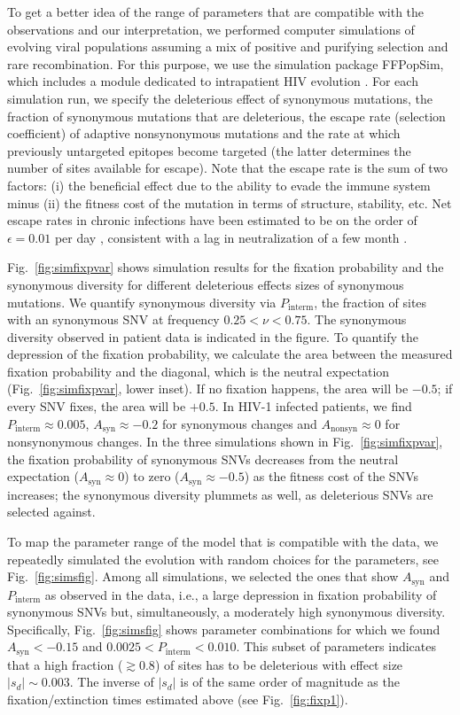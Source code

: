 \documentclass[11pt]{article}
\newcommand{\FIG}[1]{Fig.~\ref{fig:#1}}
\begin{document}
To get a better idea of the range of parameters that are compatible with the
observations and our interpretation, we performed computer simulations of
evolving viral populations assuming a mix of positive and purifying selection
and rare recombination.  For this purpose, we use the simulation package
FFPopSim, which includes a module dedicated to intrapatient HIV evolution
\citep{zanini_ffpopsim:_2012}. For each simulation run, we specify the
deleterious effect of synonymous mutations, the fraction of synonymous mutations
that are deleterious, the escape rate (selection coefficient) of adaptive
nonsynonymous mutations and the rate at which previously untargeted epitopes
become targeted (the latter determines the number of sites available for
escape). Note that the escape rate is the sum of two factors: (i) the beneficial
effect due to the ability to evade the immune system minus (ii) the fitness cost
of the mutation in terms of structure, stability, etc. Net escape rates in
chronic infections have been estimated to be on the order of $\epsilon = 0.01$
per day \citep{neher_recombination_2010, Asquith:2006p28003}, consistent
with a lag in neutralization of a few month \citep{richman_rapid_2003}.

\FIG{simfixpvar} shows simulation results for the fixation probability and the
synonymous diversity for different deleterious effects sizes of synonymous mutations.
We quantify synonymous diversity via $P_\text{interm}$, the fraction of sites
with an synonymous SNV at frequency $0.25 < \nu < 0.75$. The synonymous diversity
observed in patient data is indicated in the figure. To quantify the depression
of the fixation probability, we calculate the area between the measured fixation
probability and the diagonal, which is the neutral expectation
(\FIG{simfixpvar}, lower inset). If no fixation happens, the area will be
$-0.5$; if every SNV fixes, the area will be $+0.5$. In HIV-1 infected
patients, we find $P_\text{interm} \approx 0.005$, $A_\text{syn} \approx -0.2$
for synonymous changes and $A_\text{nonsyn} \approx 0$ for nonsynonymous
changes. In the three simulations shown in \FIG{simfixpvar}, the fixation
probability of synonymous SNVs decreases from the neutral expectation
($A_\text{syn} \approx 0$) to zero ($A_\text{syn} \approx -0.5$) as the
fitness cost of the SNVs increases; the synonymous diversity plummets as well, as
deleterious SNVs are selected against.

To map the parameter range of the model that is compatible with the data, we
repeatedly simulated the evolution with random choices for the
parameters, see \FIG{simsfig}. Among all simulations, we selected the ones
that show $A_\text{syn}$ and $P_\text{interm}$ as observed in the data, i.e., a
large depression in fixation probability of synonymous SNVs but, simultaneously,
a moderately high synonymous diversity. Specifically, \FIG{simsfig} shows
parameter combinations for which we found $A_\text{syn} < -0.15$ and $0.0025 <
P_\text{interm} < 0.010$. This subset of parameters indicates that a high fraction
($\gtrsim 0.8$) of sites has to be deleterious with effect size $|s_d| \sim
0.003$. The inverse of $|s_d|$ is of the same order of magnitude as the
fixation/extinction times estimated above (see \FIG{fixp1}).
\end{document}
